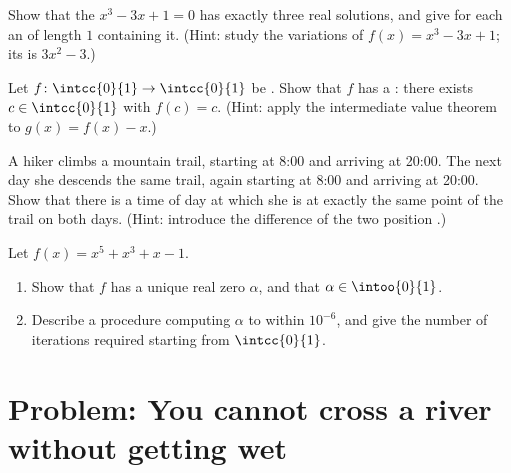 \begin{exercise}[$\star\star$]\label{exo:g12:limcont:6}
Show that the  $x^3 - 3x + 1 = 0$ has exactly three real solutions,
and give for each an  of length $1$ containing it.
(Hint: study the variations of $f(x) = x^3 - 3x + 1$; its  is
$3x^2 - 3$.)
\end{exercise}

\begin{exercise}[$\star\star$]\label{exo:g12:limcont:7}
Let $f \colon \intcc{0}{1} \to \intcc{0}{1}$ be . Show that $f$ has
a \emph{}: there exists $c \in \intcc{0}{1}$ with $f(c) = c$.
(Hint: apply the intermediate value theorem to $g(x) = f(x) - x$.)
\end{exercise}

\begin{exercise}[$\star\star\star$]\label{exo:g12:limcont:8}
A hiker climbs a mountain trail, starting at 8:00 and arriving at 20:00. The
next day she descends the same trail, again starting at 8:00 and arriving at
20:00. Show that there is a time of day at which she is at exactly the same
point of the trail on both days. (Hint: introduce the difference of the two
position .)
\end{exercise}

\begin{exercise}[$\star\star\star$]\label{exo:g12:limcont:9}
Let $f(x) = x^5 + x^3 + x - 1$.
\begin{enumerate}
  \item Show that $f$ has a unique real zero $\alpha$, and that
        $\alpha \in \intoo{0}{1}$.
  \item Describe a  procedure computing $\alpha$ to within
        $10^{-6}$, and give the number of iterations required starting from
        $\intcc{0}{1}$.
\end{enumerate}
\end{exercise}

\section{Problem: You cannot cross a river without getting wet}

